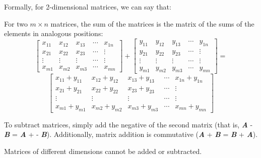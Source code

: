 Formally, for 2-dimensional matrices, we can say that:
\begin{mdframed}[style = important, frametitle={Adding and Subtracting Matrices}]
For two $m \times n$ matrices, the sum of the matrices is the matrix of the
sums of the elements in analogous positions:
$$\begin{bmatrix}
x_{11} & x_{12} & x_{13} & \cdots & x_{1n}\\
x_{21} & x_{22} & x_{23} & \cdots & \vdots\\
\vdots & \vdots & \vdots & \cdots & \vdots\\
x_{m1} & x_{m2} & x_{m3} & \cdots & x_{mn}
\end{bmatrix}
+ \begin{bmatrix}
y_{11} & y_{12} & y_{13} & \cdots & y_{1n}\\
y_{21} & y_{22} & y_{23} & \cdots & \vdots\\
\vdots & \vdots & \vdots & \cdots & \vdots\\
y_{m1} & y_{m2} & y_{m3} & \cdots & y_{mn}
\end{bmatrix} = $$
$$\begin{bmatrix}
x_{11} + y_{11} & x_{12} + y_{12} & x_{13} + y_{13} & \cdots & x_{1n} + y_{1n}\\
x_{21} + y_{21} & x_{22} + y_{22} & x_{23} + y_{23} & \cdots & \vdots\\
\vdots & \vdots & \vdots & \cdots & \vdots\\
x_{m1} + y_{m1} & x_{m2} + y_{m2} & x_{m3} + y_{m3} & \cdots & x_{mn} + y_{mn}
\end{bmatrix}$$

To subtract matrices, simply add the negative of the second matrix (that is,
\textbf{\textit{A}} - \textbf{\textit{B}} = \textbf{\textit{A}} + -\textbf{
\textit{B}}). Additionally, matrix addition is commutative (\textbf{\textit{A}}
+ \textbf{\textit{B}} = \textbf{\textit{B}} + \textbf{\textit{A}}).

Matrices of different dimensions cannot be added or subtracted. 
\end{mdframed}

